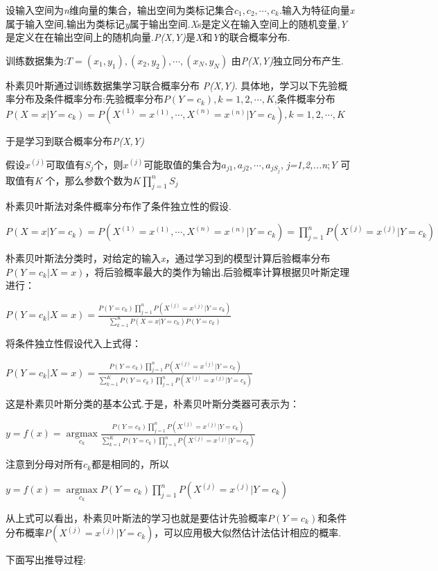 \documentclass[UTF8]{ctexart}
\begin{document}
设输入空间为\textsl{n}维向量的集合，输出空间为类标记集合${c_1,c_2,\cdots,c_k}$.输入为特征向量\textsl{x}属于输入空间,输出为类标记\textsl{y}属于输出空间.\textsl{X}s是定义在输入空间上的随机变量,\textsl{Y}是定义在在输出空间上的随机向量.\textsl{P(X,Y)}是\textsl{X}和\textsl{Y}的联合概率分布.

训练数据集为:$T={(x_1,y_{1}),(x_2,y_2),\cdots,(x_N,y_N)}$
  由\textsl{P(X,Y)}独立同分布产生.

  朴素贝叶斯通过训练数据集学习联合概率分布 \textsl{P(X,Y)}.
  具体地，学习以下先验概率分布及条件概率分布:先验概率分布$P(Y=c_k),k=1,2,\cdots,K$,条件概率分布$P(X=x|Y=c_k)=P(X^{(1)}=x^{(1)},\cdots,X^{(n)}=x^{(n)}|Y=c_{k}),k=1,2,\cdots,K$

  于是学习到联合概率分布\textsl{P(X,Y)}

  假设$x^{(j)}$可取值有$S_j$个，则$x^{(j)}$可能取值的集合为${a_{j1},a_{j2},\cdots,a_{jS_{j}}}$, \textsl{j=1,2,...n};\textsl{Y} 可取值有\textsl{K} 个，那么参数个数为$K \prod^n_{j=1} S_j$

  朴素贝叶斯法对条件概率分布作了条件独立性的假设.

  $P(X=x|Y=c_k)=P(X^{(1)}=x^{(1)},\cdots,X^{(n)}=x^{(n)}|Y=c_{k})= \prod^n_{j=1} P(X^{(j)}=x^{(j)}|Y=c_{k})$

  朴素贝叶斯法分类时，对给定的输入\textsl{x}，通过学习到的模型计算后验概率分布$P(Y=c_k|X=x)$，将后验概率最大的类作为输出.后验概率计算根据贝叶斯定理进行：

$P(Y=c_k|X=x)= \frac{P(Y=c_k) \prod^n_{j=1} P(X^{(j)}=x^{(j)}|Y=c_{k})}{ \sum^K_{k=1}  P(X=x|Y=c_{k}) P(Y=c_k) }$

将条件独立性假设代入上式得：

$P(Y=c_k|X=x)= \frac{P(Y=c_k) \prod^n_{j=1} P(X^{(j)}=x^{(j)}|Y=c_{k})}{\sum^K_{k=1} P(Y=c_k) \prod^n_{j=1} P(X^{(j)}=x^{(j)}|Y=c_{k})}$

这是朴素贝叶斯分类的基本公式.于是，朴素贝叶斯分类器可表示为：

$y=f(x)=\mathop{\arg\max}\limits_{c_{k}} \frac{P(Y=c_k) \prod^n_{j=1} P(X^{(j)}=x^{(j)}|Y=c_{k})}{\sum^K_{k=1} P(Y=c_k) \prod^n_{j=1} P(X^{(j)}=x^{(j)}|Y=c_{k})}$

注意到分母对所有$c_k$都是相同的，所以

$y=f(x)=\mathop{\arg\max}\limits_{c_{k}} P(Y=c_k) \prod^n_{j=1} P(X^{(j)}=x^{(j)}|Y=c_{k})$

从上式可以看出，朴素贝叶斯法的学习也就是要估计先验概率$P(Y=c_k)$和条件分布概率$P(X^{(j)}=x^{(j)}|Y=c_{k})$，可以应用极大似然估计法估计相应的概率.

下面写出推导过程:
\end{document}
